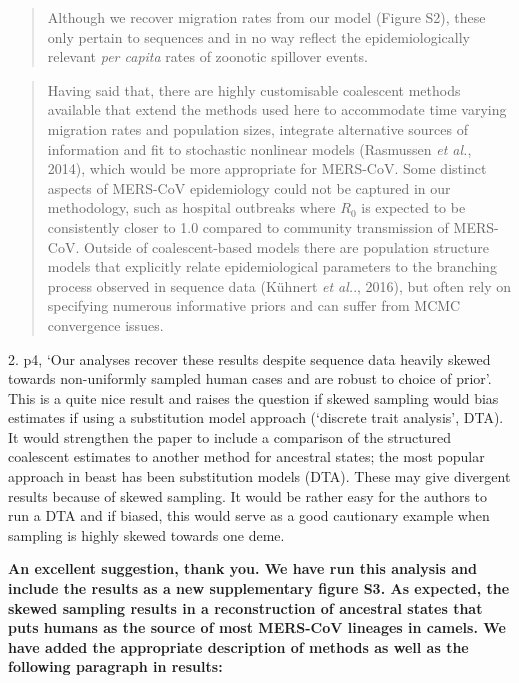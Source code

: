 \documentclass[11pt,oneside,letterpaper]{article}
\begin{document}
\begin{quotation}
Although we recover migration rates from our model (Figure S2), these only pertain to sequences and in no way reflect the epidemiologically relevant \textit{per capita} rates of zoonotic spillover events.
\end{quotation}

\begin{quotation}
Having said that, there are highly customisable coalescent methods available that extend the methods used here to accommodate time varying migration rates and population sizes, integrate alternative sources of information and fit to stochastic nonlinear models (Rasmussen \textit{et al.}, 2014), which would be more appropriate for MERS-CoV.
Some distinct aspects of MERS-CoV epidemiology could not be captured in our methodology, such as hospital outbreaks where $R_{0}$ is expected to be consistently closer to 1.0 compared to community transmission of MERS-CoV.
Outside of coalescent-based models there are population structure models that explicitly relate epidemiological parameters to the branching process observed in sequence data (K\"{u}hnert \textit{et al.}., 2016), but often rely on specifying numerous informative priors and can suffer from MCMC convergence issues.
\end{quotation}

%
2. p4, `Our analyses recover these results despite sequence data heavily skewed towards non-uniformly sampled human cases and are robust to choice of prior'. This is a quite nice result and raises the question if skewed sampling would bias estimates if using a substitution model approach (`discrete trait analysis', DTA). It would strengthen the paper to include a comparison of the structured coalescent estimates to another method for ancestral states; the most popular approach in beast has been substitution models (DTA). These may give divergent results because of skewed sampling. It would be rather easy for the authors to run a DTA and if biased, this would serve as a good cautionary example when sampling is highly skewed towards one deme.

\textbf{An excellent suggestion, thank you. We have run this analysis and include the results as a new supplementary figure S3. As expected, the skewed sampling results in a reconstruction of ancestral states that puts humans as the source of most MERS-CoV lineages in camels. We have added the appropriate description of methods as well as the following paragraph in results:}
\end{document}
